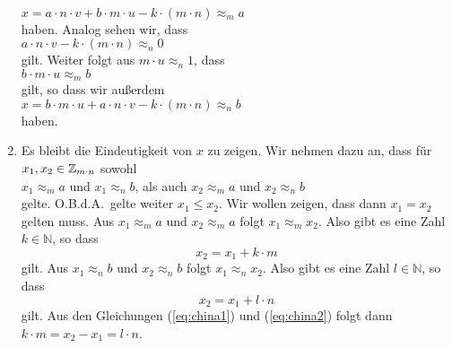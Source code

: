 \begin{enumerate}
      \\[0.2cm]
      \hspace*{1.3cm}
      $x = a \cdot n \cdot v + b \cdot m \cdot u - k \cdot (m \cdot n) \approx_m a$
      \\[0.2cm]
      haben.  Analog sehen wir, dass
      \\[0.2cm]
      \hspace*{1.3cm}
      $a \cdot n \cdot v - k \cdot (m \cdot n) \approx_n 0$
      \\[0.2cm]
      gilt.  Weiter folgt aus $m \cdot u \approx_n 1$, dass
      \\[0.2cm]
      \hspace*{1.3cm}
      $b \cdot m \cdot u \approx_m b$ 
      \\[0.2cm]
      gilt, so dass wir außerdem
      \\[0.2cm]
      \hspace*{1.3cm}
      $x = b \cdot m \cdot u + a \cdot n \cdot v - k \cdot (m \cdot n) \approx_n b$
      \\[0.2cm]
      haben. 
\item Es bleibt die Eindeutigkeit von $x$ zu zeigen.  Wir nehmen dazu an, dass für 
      $x_1, x_2\in \mathbb{Z}_{m \cdot n}$ sowohl
      \\[0.2cm]
      \hspace*{1.3cm}
      $x_1 \approx_m a$ und $x_1 \approx_n b$, \quad als auch \quad
      $x_2 \approx_m a$ und $x_2 \approx_n b$
      \\[0.2cm]
      gelte.  O.B.d.A.~gelte weiter $x_1 \leq x_2$.  Wir wollen zeigen, dass dann $x_1 = x_2$ gelten muss.
      Aus $x_1 \approx_m a$ und $x_2 \approx_m a$ folgt $x_1 \approx_m x_2$.  Also gibt es
      eine Zahl $k \in \mathbb{N}$, so 
      dass 
      \begin{equation}
        \label{eq:china1}
        x_2 = x_1 + k \cdot m  
      \end{equation}
      gilt.  Aus $x_1 \approx_n b$ und $x_2 \approx_n b$ folgt $x_1 \approx_n x_2$.  Also gibt es eine Zahl 
      $l \in \mathbb{N}$, so dass 
      \begin{equation}
        \label{eq:china2}
        x_2 = x_1 + l \cdot n  
      \end{equation}
      gilt.  Aus den Gleichungen  (\ref{eq:china1}) und (\ref{eq:china2}) folgt dann
      \\[0.2cm]
      \hspace*{1.3cm}
      $k \cdot m = x_2 - x_1 = l \cdot n$.
      \\[0.2cm]

\end{enumerate}
